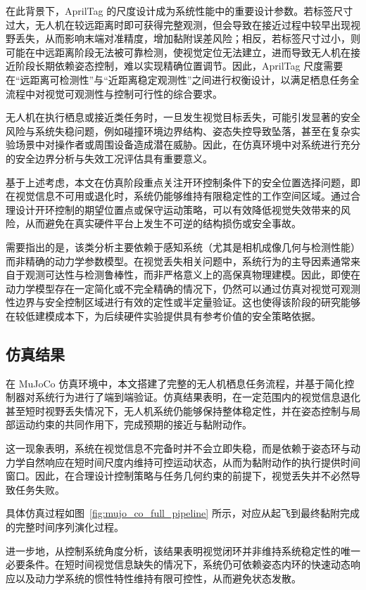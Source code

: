 在此背景下，AprilTag 的尺度设计成为系统性能中的重要设计参数。若标签尺寸过大，无人机在较远距离时即可获得完整观测，但会导致在接近过程中较早出现视野丢失，从而影响末端对准精度，增加黏附误差风险；相反，若标签尺寸过小，则可能在中远距离阶段无法被可靠检测，使视觉定位无法建立，进而导致无人机在接近阶段长期依赖姿态控制，难以实现精确位置调节。因此，AprilTag 尺度需要在“远距离可检测性”与“近距离稳定观测性”之间进行权衡设计，以满足栖息任务全流程中对视觉可观测性与控制可行性的综合要求。

无人机在执行栖息或接近类任务时，一旦发生视觉目标丢失，可能引发显著的安全风险与系统失稳问题，例如碰撞环境边界结构、姿态失控导致坠落，甚至在复杂实验场景中对操作者或周围设备造成潜在威胁。因此，在仿真环境中对系统进行充分的安全边界分析与失效工况评估具有重要意义。

基于上述考虑，本文在仿真阶段重点关注开环控制条件下的安全位置选择问题，即在视觉信息不可用或退化时，系统仍能够维持有限稳定性的工作空间区域。通过合理设计开环控制的期望位置点或保守运动策略，可以有效降低视觉失效带来的风险，从而避免在真实硬件平台上发生不可逆的结构损伤或安全事故。

需要指出的是，该类分析主要依赖于感知系统（尤其是相机成像几何与检测性能）而非精确的动力学参数模型。在视觉丢失相关问题中，系统行为的主导因素通常来自于观测可达性与检测鲁棒性，而非严格意义上的高保真物理建模。因此，即使在动力学模型存在一定简化或不完全精确的情况下，仍然可以通过仿真对视觉可观测性边界与安全控制区域进行有效的定性或半定量验证。这也使得该阶段的研究能够在较低建模成本下，为后续硬件实验提供具有参考价值的安全策略依据。

\subsection{仿真结果}
在 MuJoCo 仿真环境中，本文搭建了完整的无人机栖息任务流程，并基于简化控制器对系统行为进行了端到端验证。仿真结果表明，在一定范围内的视觉信息退化甚至短时视野丢失情况下，无人机系统仍能够保持整体稳定性，并在姿态控制与局部运动约束的共同作用下，完成预期的接近与黏附动作。

这一现象表明，系统在视觉信息不完备时并不会立即失稳，而是依赖于姿态环与动力学自然响应在短时间尺度内维持可控运动状态，从而为黏附动作的执行提供时间窗口。因此，在合理设计控制策略与任务几何约束的前提下，视觉丢失并不必然导致任务失败。

具体仿真过程如图~\ref{fig:mujo_co_full_pipeline} 所示，对应从起飞到最终黏附完成的完整时间序列演化过程。

进一步地，从控制系统角度分析，该结果表明视觉闭环并非维持系统稳定性的唯一必要条件。在短时间视觉信息缺失的情况下，系统仍可依赖姿态内环的快速动态响应以及动力学系统的惯性特性维持有限可控性，从而避免状态发散。

